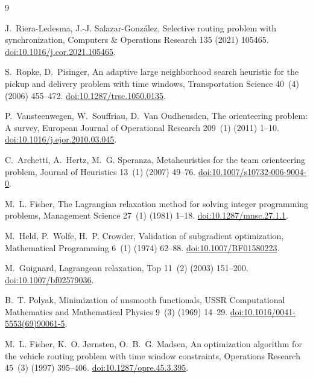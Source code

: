 \documentclass[11pt,a4paper]{article}
\begin{document}
\begin{thebibliography}{9}

J.~Riera-Ledesma, J.-J. Salazar-Gonz\'alez,
Selective routing problem with synchronization,
Computers \& Operations Research 135 (2021) 105465.
\href{https://doi.org/10.1016/j.cor.2021.105465}{doi:10.1016/j.cor.2021.105465}.

S.~Ropke, D.~Pisinger,
An adaptive large neighborhood search heuristic for the pickup and delivery
problem with time windows,
Transportation Science 40~(4) (2006) 455--472.
\href{https://doi.org/10.1287/trsc.1050.0135}{doi:10.1287/trsc.1050.0135}.

P.~Vansteenwegen, W.~Souffriau, D.~Van Oudheusden,
The orienteering problem: A survey,
European Journal of Operational Research 209~(1) (2011) 1--10.
\href{https://doi.org/10.1016/j.ejor.2010.03.045}{doi:10.1016/j.ejor.2010.03.045}.

C.~Archetti, A.~Hertz, M.~G. Speranza,
Metaheuristics for the team orienteering problem,
Journal of Heuristics 13~(1) (2007) 49--76.
\href{https://doi.org/10.1007/s10732-006-9004-0}{doi:10.1007/s10732-006-9004-0}.

M.~L. Fisher,
The Lagrangian relaxation method for solving integer programming problems,
Management Science 27~(1) (1981) 1--18.
\href{https://doi.org/10.1287/mnsc.27.1.1}{doi:10.1287/mnsc.27.1.1}.

M.~Held, P.~Wolfe, H.~P. Crowder,
Validation of subgradient optimization,
Mathematical Programming 6~(1) (1974) 62--88.
\href{https://doi.org/10.1007/BF01580223}{doi:10.1007/BF01580223}.

M.~Guignard,
Lagrangean relaxation,
Top 11~(2) (2003) 151--200.
\href{https://doi.org/10.1007/bf02579036}{doi:10.1007/bf02579036}.

B.~T. Polyak,
Minimization of unsmooth functionals,
USSR Computational Mathematics and Mathematical Physics 9~(3) (1969) 14--29.
\href{https://doi.org/10.1016/0041-5553(69)90061-5}{doi:10.1016/0041-5553(69)90061-5}.

M.~L. Fisher, K.~O. J\o rnsten, O.~B.~G. Madsen,
An optimization algorithm for the vehicle routing problem with time window
constraints,
Operations Research 45~(3) (1997) 395--406.
\href{https://doi.org/10.1287/opre.45.3.395}{doi:10.1287/opre.45.3.395}.


\end{thebibliography}
\end{document}
